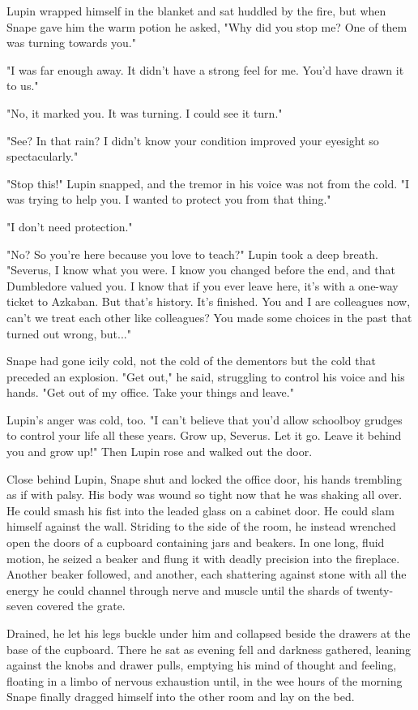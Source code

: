Lupin wrapped himself in the blanket and sat huddled by the fire, but when Snape gave him the warm potion he asked, "Why did you stop me? One of them was turning towards you."

"I was far enough away. It didn't have a strong feel for me. You'd have drawn it to us."

"No, it marked you. It was turning. I could see it turn."

"See? In that rain? I didn't know your condition improved your eyesight so spectacularly."

"Stop this!" Lupin snapped, and the tremor in his voice was not from the cold. "I was trying to help you. I wanted to protect you from that thing."

"I don't need protection."

"No? So you're here because you love to teach?" Lupin took a deep breath. "Severus, I know what you were. I know you changed before the end, and that Dumbledore valued you. I know that if you ever leave here, it's with a one-way ticket to Azkaban. But that's history. It's finished. You and I are colleagues now, can't we treat each other like colleagues? You made some choices in the past that turned out wrong, but..."

Snape had gone icily cold, not the cold of the dementors but the cold that preceded an explosion. "Get out," he said, struggling to control his voice and his hands. "Get out of my office. Take your things and leave."

Lupin's anger was cold, too. "I can't believe that you'd allow schoolboy grudges to control your life all these years. Grow up, Severus. Let it go. Leave it behind you and grow up!" Then Lupin rose and walked out the door.

Close behind Lupin, Snape shut and locked the office door, his hands trembling as if with palsy. His body was wound so tight now that he was shaking all over. He could smash his fist into the leaded glass on a cabinet door. He could slam himself against the wall. Striding to the side of the room, he instead wrenched open the doors of a cupboard containing jars and beakers. In one long, fluid motion, he seized a beaker and flung it with deadly precision into the fireplace. Another beaker followed, and another, each shattering against stone with all the energy he could channel through nerve and muscle until the shards of twenty-seven covered the grate.

Drained, he let his legs buckle under him and collapsed beside the drawers at the base of the cupboard. There he sat as evening fell and darkness gathered, leaning against the knobs and drawer pulls, emptying his mind of thought and feeling, floating in a limbo of nervous exhaustion until, in the wee hours of the morning Snape finally dragged himself into the other room and lay on the bed.

